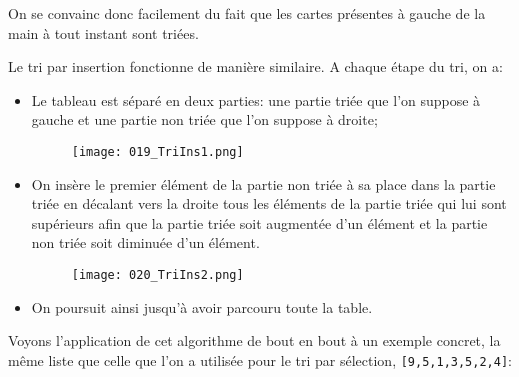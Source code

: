 \documentclass[12pt]{article}
\begin{document}
	On se convainc donc facilement du fait que les cartes présentes à gauche de la main à tout instant sont triées.
	
	Le tri par insertion fonctionne de manière similaire. A chaque étape du tri, on a:
	\begin{itemize}
		\item Le tableau est séparé en deux parties: une partie triée que l'on suppose à gauche et une partie non triée que l’on suppose à droite;
		\begin{figure}[H]
			\centering
			\texttt{[image: 019\_TriIns1.png]}
		\end{figure}
		\item On insère le premier élément de la partie non triée à sa place dans la partie triée en décalant vers la droite tous les éléments de la partie triée qui lui sont supérieurs afin que la partie triée soit augmentée d'un élément et la partie non triée soit diminuée d’un élément.
		\begin{figure}[H]
			\centering
			\texttt{[image: 020\_TriIns2.png]}
		\end{figure}
		\item On poursuit ainsi jusqu'à avoir parcouru toute la table.
	\end{itemize}
	
	Voyons l'application de cet algorithme de bout en bout à un exemple concret, la même liste que celle que l'on a utilisée pour le tri par sélection,  \texttt{[9,5,1,3,5,2,4]}:
	
\end{document}
